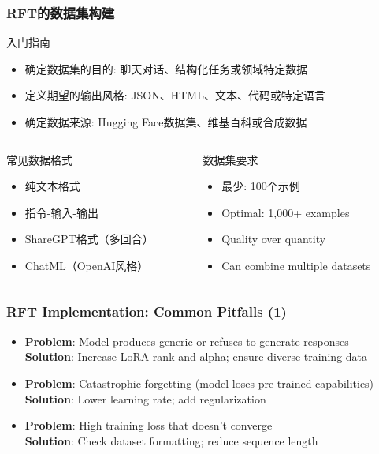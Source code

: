 \documentclass[aspectratio=169]{beamer}
\begin{document}
\begin{frame}
	\frametitle{RFT的数据集构建}
	\begin{block}{入门指南}
		\begin{itemize}
			\item 确定数据集的目的: 聊天对话、结构化任务或领域特定数据
			\item 定义期望的输出风格: JSON、HTML、文本、代码或特定语言
			\item 确定数据来源: Hugging Face数据集、维基百科或合成数据
		\end{itemize}
	\end{block}
	\begin{columns}
		\begin{column}{0.48\textwidth}
			\begin{block}{常见数据格式}
				\begin{itemize}
					\item 纯文本格式
					\item 指令-输入-输出
					\item ShareGPT格式（多回合）
					\item ChatML（OpenAI风格）
				\end{itemize}
			\end{block}
		\end{column}
		\begin{column}{0.48\textwidth}
			\begin{block}{数据集要求}
				\begin{itemize}
					\item 最少: 100个示例
					\item Optimal: 1,000+ examples
					\item Quality over quantity
					\item Can combine multiple datasets
				\end{itemize}
			\end{block}
		\end{column}
	\end{columns}
\end{frame}

\begin{frame}
	\frametitle{RFT Implementation: Common Pitfalls (1)}
	\begin{itemize}
		\item \textbf{Problem}: Model produces generic or refuses to generate responses\\
		  \textbf{Solution}: Increase LoRA rank and alpha; ensure diverse training data
		\item \textbf{Problem}: Catastrophic forgetting (model loses pre-trained capabilities)\\
		  \textbf{Solution}: Lower learning rate; add regularization
		\item \textbf{Problem}: High training loss that doesn't converge\\
		  \textbf{Solution}: Check dataset formatting; reduce sequence length
	\end{itemize}
\end{frame}
\end{document}
